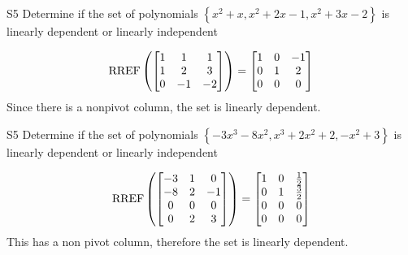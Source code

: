 \begin{problem}{S5}
Determine if the set of polynomials  $\left\{x^2+x, x^2+2x-1, x^2+3x-2\right\}$ is  linearly dependent or linearly independent
\end{problem}
\begin{solution}
$$\operatorname{RREF}\left( \begin{bmatrix} 1 &  1 & 1 \\ 1  & 2 & 3 \\ 0  & -1 & -2 \end{bmatrix} \right) = \begin{bmatrix} 1 &  0 & -1 \\ 0  & 1 & 2 \\ 0& 0 & 0  \end{bmatrix}$$
Since there is a nonpivot column, the set is linearly dependent.
\end{solution}

\begin{problem}{S5}
Determine if the set of polynomials $\left\{ -3x^3-8x^2, x^3+2x^2+2, -x^2+3\right\}$ is  linearly dependent or linearly independent
\end{problem}
\begin{solution}
$$\operatorname{RREF}\left( \begin{bmatrix}-3 & 1 & 0 \\ -8 & 2 & -1 \\ 0 & 0 & 0 \\ 0 & 2 & 3 \end{bmatrix}\right) = \begin{bmatrix} 1 & 0 & \frac{1}{2} \\ 0 & 1 & \frac{3}{2} \\ 0 & 0 & 0 \\ 0 & 0 & 0 \end{bmatrix}$$
This has a non pivot column, therefore the set is linearly dependent.
\end{solution}

